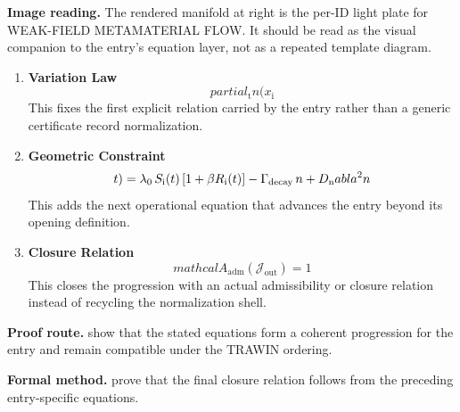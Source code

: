\begin{samepage}
\noindent\begin{minipage}[t]{0.45\linewidth}
\vspace{0pt}
\raggedright
\scriptsize\textbf{Image reading.} The rendered manifold at right is the per-ID light plate for WEAK-FIELD METAMATERIAL FLOW. It should be read as the visual companion to the entry's equation layer, not as a repeated template diagram.\par
\end{minipage}\hfill
\begin{minipage}[t]{0.53\linewidth}
\vspace*{-0.10in}
\raggedright
{}
\end{minipage}
\end{samepage}

\clearpage


\begin{enumerate}[leftmargin=1.6em,itemsep=9pt,topsep=6pt]
\item \textbf{Variation Law}
\[
partial_{\mathrm{t}} n(x_{\mathrm{i}}
\]
This fixes the first explicit relation carried by the entry rather than a generic certificate record normalization.

\item \textbf{Geometric Constraint}
\[
t) = \lambda_0\,S_{\mathrm{i}}(t)\,[1+\beta R_{\mathrm{i}}(t)] - \Gamma_{\rm decay}\,n + D_{\mathrm{n}} abla^2 n
\]
This adds the next operational equation that advances the entry beyond its opening definition.

\item \textbf{Closure Relation}
\[
mathcal{A}_{\mathrm{adm}}\!\left(\mathcal{J}_{\mathrm{out}}\right)=1
\]
This closes the progression with an actual admissibility or closure relation instead of recycling the normalization shell.
\end{enumerate}

\textbf{Proof route.} show that the stated equations form a coherent progression for the entry and remain compatible under the TRAWIN ordering.

\textbf{Formal method.} prove that the final closure relation follows from the preceding entry-specific equations.

\medskip
{}

